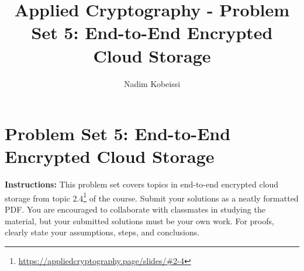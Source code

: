 \documentclass[10pt,a4paper,american]{exam}
\title{Applied Cryptography - Problem Set 5: End-to-End Encrypted Cloud Storage}
\author{Nadim Kobeissi}
\begin{document}
\classhandoutheader
\section*{Problem Set 5: End-to-End Encrypted Cloud Storage}

\begin{tcolorbox}[colframe=OliveGreen!30!white,colback=OliveGreen!5!white]
	\textbf{Instructions:} This problem set covers topics in end-to-end encrypted cloud storage from topic 2.4\footnote{\url{https://appliedcryptography.page/slides/\#2-4}} of the course. Submit your solutions as a neatly formatted PDF. You are encouraged to collaborate with classmates in studying the material, but your submitted solutions must be your own work. For proofs, clearly state your assumptions, steps, and conclusions.
\end{tcolorbox}
\end{document}
